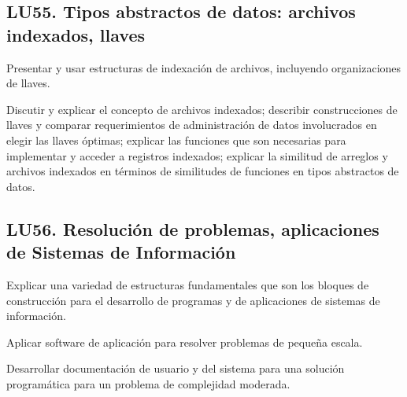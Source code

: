 \subsection{LU55. Tipos abstractos de datos: archivos indexados, llaves}\label{sec:BOK-LU55}\label{sec:LU55}
\begin{LearningUnit}
\begin{LUGoal}
\item Presentar y usar estructuras de indexación de archivos, incluyendo organizaciones de llaves.
\end{LUGoal}

\begin{LUObjective}
\item Discutir y explicar el concepto de archivos indexados; describir construcciones de llaves y comparar requerimientos de administración de datos involucrados en elegir las llaves óptimas; explicar las funciones que son necesarias para implementar y acceder a registros indexados; explicar la similitud de arreglos y archivos indexados en términos de similitudes de funciones en tipos abstractos de datos.
\end{LUObjective}
\end{LearningUnit}

\subsection{LU56. Resolución de problemas, aplicaciones de Sistemas de Información}\label{sec:BOK-LU56}\label{sec:LU56}
\begin{LearningUnit}
\begin{LUGoal}
\item Explicar una variedad de estructuras fundamentales que son los bloques de construcción para el desarrollo de programas y de aplicaciones de sistemas de información.
\end{LUGoal}

\begin{LUObjective}
\item Aplicar software de aplicación para resolver problemas de pequeña escala.
\item Desarrollar documentación de usuario y del sistema para una solución programática para un problema de complejidad moderada.
\end{LUObjective}
\end{LearningUnit}

